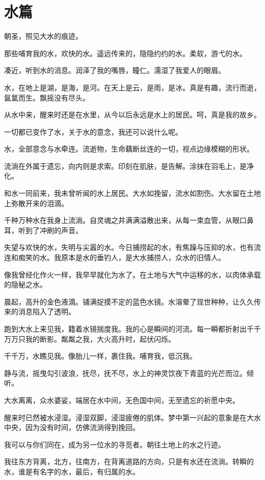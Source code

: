 \documentclass[UTF8]{article}
\begin{document}
\section{水篇}
\par 朝圣，照见大水的痕迹。
\par 那些哺育我的水，欢快的水。遥远传来的，隐隐约约的水。柔软，游弋的水。
\par 凑近，听到水的消息。润泽了我的嘴唇，瞳仁。濡湿了我爱人的眼眉。
\par 水，在地上是湖，是海，是河。在天上是云，是雨，是冰。真是有趣，流行而逝，氤氲而生。飘摇没有尽头。
\par 从水中来，醒来时还是在水里，从今以后永远是水上的居民。呵，真是我的故乡。
\par 一切都已变作了水，关于水的意念，我还可以说什么呢。
\\[0.6cm]
\par 水，全部意念与水牵连。流逝物，生命藕断丝连的一切，视点边缘模糊的形状。
\par 流淌在外属于遗忘，向内则是求索。印刻在肌肤，是告解。涂抹在羽毛上，是净化。
\par 和水一同前来，我未曾听闻的水上居民。大水如挽留，流水如割伤。大水留在土地上弥散开来的泪滴。
\par 千种万种水在我身上流淌。自灵魂之井满满溢散出来，从每一束血管，从眼口鼻耳，听到了冲刷的声音。
\par 失望与欢快的水，失明与尖嚣的水。今日捕捞起的水，有焦躁与压抑的水，也有流连和痴笑的水。我原本是水的垂钓人，是大水捕捞人，众水的旧情人。
\par 像我曾经化作火一样，我早早就化为水了。在土地与大气中运移的水，以肉体承载的隐秘之水。
\par 晨起，高升的金色液滴。铺满捉摸不定的蓝色水镜。水溶晕了现世种种，让久久传来的消息陷入了透明。
\par 跑到大水上来见我，籍着水镜揣度我。我的心是瞬间的河流。每一瞬都折射出千千万万只我的断影。粼粼之我，大火高升时，起伏闪烁。
\par 千千万，水瞧见我。像胎儿一样，裹住我。哺育我，低沉我。
\par 静与流，摇曳勾引波浪，抚尽，抚不尽，水上的神灵饮夜下青蓝的光芒而泣。倾听。
\par 大水离离，众水婆娑，端居在水中间，无色国中间，无至遗忘的祈愿中央。
\par 醒来时已然被水浸湿。浸湿双脚，浸湿疲倦的肌体。梦中第一兴起的意象是在大水中央，因为没有时间，仿佛流淌得到挽回。
\par 我可以与你们同在，成为另一位水的寻觅者。朝往土地上的水之行迹。
\par 我往东方背离，北方，往南方，在背离道路的方向，只是有水还在流淌。转瞬的水，谁是有名字的水，最后，有归属的水。
\end{document}
